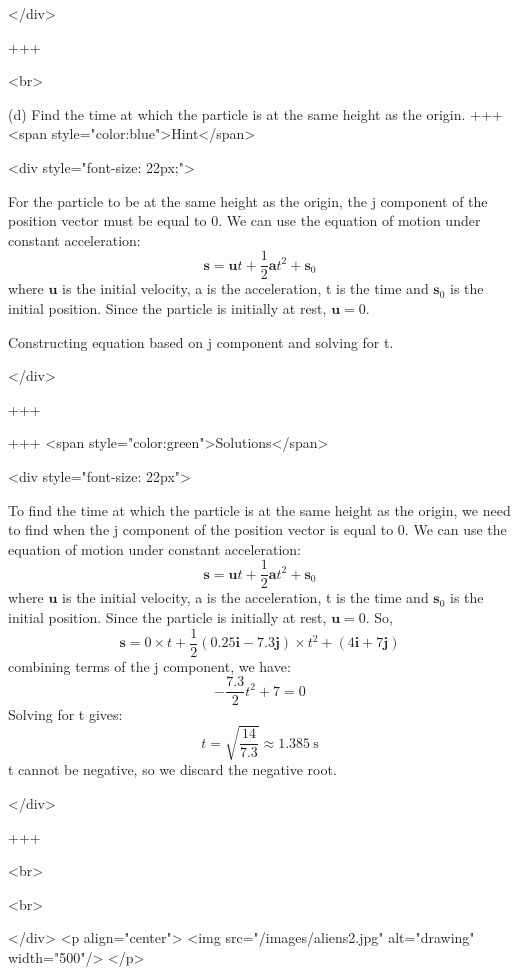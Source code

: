 </div>

+++

<br>



(d) Find the time at which the particle is at the same height as the origin.
+++ <span style="color:blue">Hint</span>

<div style="font-size: 22px;">

For the particle to be at the same height as the origin, the j component of the position vector must be equal to 0.
We can use the equation of motion under constant acceleration:
$$\mathbf{s}=\mathbf{u} t+\frac{1}{2} \mathbf{a} t^{2}+\mathbf{s}_{0}$$
where $\mathbf{u}$ is the initial velocity, a is the acceleration, t is the time and $\mathbf{s}_{0}$ is the initial position. Since the particle is initially at rest, $\mathbf{u}=0$.

Constructing equation based on j component and solving for t.

</div>

+++

+++ <span style="color:green">Solutions</span>

<div style="font-size: 22px">

To find the time at which the particle is at the same height as the origin, we need to find when the j component of the position vector is equal to 0. We can use the equation of motion under constant acceleration:
$$\mathbf{s}=\mathbf{u} t+\frac{1}{2} \mathbf{a} t^{2}+\mathbf{s}_{0}$$
where $\mathbf{u}$ is the initial velocity, a is the acceleration, t is the time and $\mathbf{s}_{0}$ is the initial position. Since the particle is initially at rest, $\mathbf{u}=0$.
So,
\[\mathbf{s}=0 \times t+\frac{1}{2}\left(0.25 \mathbf{i}-7.3 \mathbf{j}\right) \times t^{2}+(4 \mathbf{i}+7 \mathbf{j})\]
combining terms of the j component, we have:
\[-\frac{7.3}{2} t^{2}+7=0\]
Solving for t gives:
\[t=\sqrt{\frac{14}{7.3}} \approx 1.385 \mathrm{~s}\]
t cannot be negative, so we discard the negative root.

</div>

+++

<br>


<br>

</div>
<p align="center">
<img src="/images/aliens2.jpg" alt="drawing" width="500"/>
</p>
